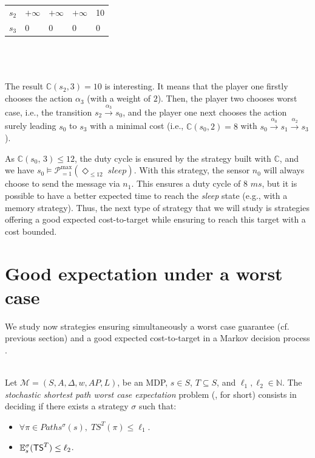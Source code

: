 \begin{example}
\begin{minipage}{0.5\linewidth}
\begin{tabular}{l|llll}
$s_2$  & $+\infty$ & $+\infty$ & $+\infty$ & 10    \\
$s_3$  & 0         & 0         & 0         & 0
\end{tabular}
\captionsetup{justification=centering}
\end{minipage}
\\$ $\\$ $\\
The result $\mathbb{C}(s_2,3)=10$ is interesting. It means that the player one firstly chooses the action $\alpha_3$ (with a weight of $2$).
Then, the player two chooses worst case, i.e., the transition $s_2 \xrightarrow{\alpha_3}s_0$, and the player one next chooses the action surely leading $s_0$ to $s_3$ with a minimal cost (i.e., $\mathbb{C}(s_0, 2)=8$ with $s_0\xrightarrow{\alpha_0}s_1\xrightarrow{\alpha_2}s_3$).
\par As $\mathbb{C}(s_0,\, 3) \leq 12$, the duty cycle is ensured by the strategy built with $\mathbb{C}$, and we have $s_0 \models \mathcal{P}^{\max}_{=1}(\Diamond_{\leq 12}\; \textit{sleep})$.
With this strategy, the sensor $n_0$ will always choose to send the message via $n_1$.
This ensures a duty cycle of $8$ $ms$, but it is possible to have a better expected time to reach the \textit{sleep} state (e.g., with a memory strategy).
Thus, the next type of strategy that we will study is strategies offering a good expected cost-to-target while ensuring to reach this target with a cost bounded.
\end{example}

\section{Good expectation under a worst case}
We study now strategies ensuring simultaneously a worst case guarantee (cf. previous section) and a good expected cost-to-target in a Markov decision process \cite{DBLP:journals/corr/RandourRS14a, DBLP:journals/iandc/BruyereFRR17}.
$ $ \\ $ $ \\
\begin{definition}
    Let $\mathcal{M}=(S, A, \Delta, w, AP, L)$, be an MDP, $s \in S$, $T \subseteq S$, and $\ell_1, \ell_2 \in \mathbb{N}$.
    The \textit{stochastic shortest path worst case expectation} problem (\SSPWE{}, for short) consists in deciding if there exists a strategy $\sigma$ such that:
    \begin{itemize}
      \item $\forall \pi \in Paths^\sigma(s), \; TS^T(\pi) \leq \ell_1$.
      \item $\mathbb{E}_s^\sigma(\text{\sffamily TS}^T) \leq \ell_2$.
    \end{itemize}
\end{definition}

